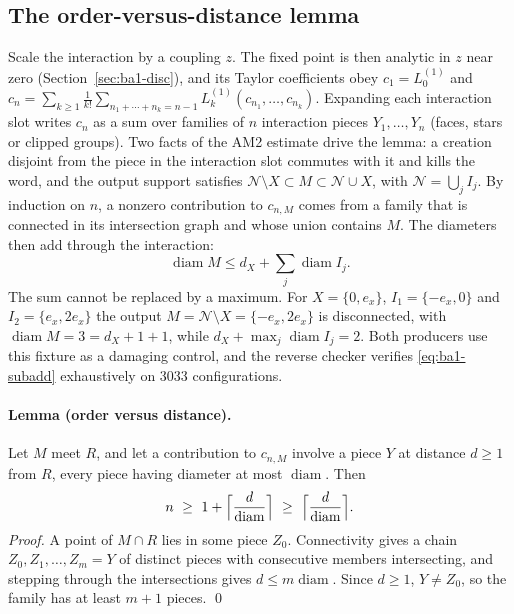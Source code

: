 \subsection{The order-versus-distance lemma}
\label{sec:ba1-order}
Scale the interaction by a coupling $z$. The fixed point is then analytic in
$z$ near zero (Section~\ref{sec:ba1-disc}), and its Taylor coefficients obey
$c_1=L^{(1)}_0$ and
$c_n=\sum_{k\ge1}\frac1{k!}\sum_{n_1+\cdots+n_k=n-1}L^{(1)}_k(c_{n_1},\ldots,c_{n_k})$.
Expanding each interaction slot writes $c_n$ as a sum over families of $n$
interaction pieces $Y_1,\ldots,Y_n$ (faces, stars or clipped groups). Two
facts of the AM2 estimate drive the lemma: a creation disjoint from the piece
in the interaction slot commutes with it and kills the word, and the output
support satisfies $\mathcal N\setminus X\subset M\subset\mathcal N\cup X$,
with $\mathcal N=\bigcup_jI_j$. By induction on $n$, a nonzero contribution
to $c_{n,M}$ comes from a family that is connected in its intersection graph
and whose union contains $M$. The diameters then add through the interaction:
\begin{equation}
 \operatorname{diam}M\le d_X+\sum_j\operatorname{diam}I_j .
 \label{eq:ba1-subadd}
\end{equation}
The sum cannot be replaced by a maximum. For $X=\{0,e_x\}$,
$I_1=\{-e_x,0\}$ and $I_2=\{e_x,2e_x\}$ the output
$M=\mathcal N\setminus X=\{-e_x,2e_x\}$ is disconnected, with
$\operatorname{diam}M=3=d_X+1+1$, while $d_X+\max_j\operatorname{diam}I_j=2$.
Both producers use this fixture as a damaging control, and the reverse checker
verifies \eqref{eq:ba1-subadd} exhaustively on 3033 configurations.

\paragraph{Lemma (order versus distance).} Let $M$ meet $R$, and let a
contribution to $c_{n,M}$ involve a piece $Y$ at distance $d\ge1$ from $R$,
every piece having diameter at most $\operatorname{diam}$. Then
\begin{equation}
 n\ \ge\ 1+\Bigl\lceil\frac{d}{\operatorname{diam}}\Bigr\rceil\ \ge\
 \Bigl\lceil\frac{d}{\operatorname{diam}}\Bigr\rceil .
 \label{eq:ba1-order}
\end{equation}
\emph{Proof.} A point of $M\cap R$ lies in some piece $Z_0$. Connectivity
gives a chain $Z_0,Z_1,\ldots,Z_m=Y$ of distinct pieces with consecutive
members intersecting, and stepping through the intersections gives
$d\le m\operatorname{diam}$. Since $d\ge1$, $Y\ne Z_0$, so the family has at
least $m+1$ pieces. \qed


